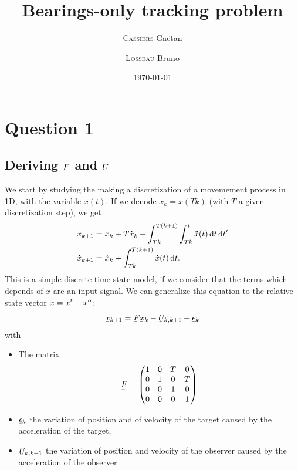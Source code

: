 \documentclass[english,DIV=13]{scrartcl}
\title{Bearings-only tracking problem}
\subtitle{}
\author{\textsc{Cassiers} Gaëtan \and \textsc{Losseau} Bruno}
\date{\today}
\newcommand{\ubar}[1]{\underaccent{\bar}{#1}}
\newcommand{\uvec}[1]{\ubar{#1}}
\newcommand{\umatrix}[1]{\ubar{\ubar{#1}}}
\begin{document}
\maketitle


\section*{Question 1}
\subsection*{Deriving $\umatrix{F}$ and $\uvec{U}$}

We start by studying the making a discretization of a movemement process in 1D, with the
variable $x(t)$. If we denode $x_k = x(Tk)$ (with $T$ a given discretization step), we
get
\begin{align*}
    x_{k+1} &= x_k + T\dot{x}_k + \int_{Tk}^{T(k+1)}\int_{Tk}^{t}\ddot{x}(t)\operatorname{d}\! t\operatorname{d}\! t' \\
    \dot{x}_{k+1} &=  \dot{x}_k + \int_{Tk}^{T(k+1)}\dot{x}(t)\operatorname{d}\! t.
\end{align*}
This is a simple discrete-time state model, if we consider that the terms which depends of $\ddot{x}$
are an input signal.
We can generalize this equation to the relative state vector $\uvec{x} = \uvec{x}^t - \uvec{x}^o$:
\[\uvec{x}_{k+1} = \umatrix{F}\uvec{x}_k - \uvec{U}_{k,k+1} + \uvec{\epsilon}_k\]
with
\begin{itemize}
    \item The matrix
        \[\umatrix{F} =
        \begin{pmatrix}
            1 & 0 & T & 0 \\
            0 & 1 & 0 & T \\   
            0 & 0 & 1 & 0 \\
            0 & 0 & 0 & 1   
        \end{pmatrix}
        \]
    \item $\uvec{\epsilon}_k$ the variation of position and of velocity of the target caused by the
acceleration of the target,
    \item $\uvec{U}_{k,k+1}$ the variation of position and velocity of
the observer caused by the acceleration of the observer.
\end{itemize}
\end{document}
